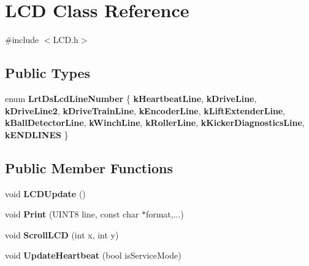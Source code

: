\hypertarget{class_l_c_d}{\section{\-L\-C\-D \-Class \-Reference}
\label{class_l_c_d}
}


{\ttfamily \#include $<$\-L\-C\-D.\-h$>$}

\subsection*{\-Public \-Types}
\begin{DoxyCompactItemize}
\item 
enum {\bfseries \-Lrt\-Ds\-Lcd\-Line\-Number} \{ \*
{\bfseries k\-Heartbeat\-Line}, 
{\bfseries k\-Drive\-Line}, 
{\bfseries k\-Drive\-Line2}, 
{\bfseries k\-Drive\-Train\-Line}, 
\*
{\bfseries k\-Encoder\-Line}, 
{\bfseries k\-Lift\-Extender\-Line}, 
{\bfseries k\-Ball\-Detector\-Line}, 
{\bfseries k\-Winch\-Line}, 
\*
{\bfseries k\-Roller\-Line}, 
{\bfseries k\-Kicker\-Diagnostics\-Line}, 
{\bfseries k\-E\-N\-D\-L\-I\-N\-E\-S}
 \}
\end{DoxyCompactItemize}
\subsection*{\-Public \-Member \-Functions}
\begin{DoxyCompactItemize}
\item 
\hypertarget{class_l_c_d_a6d4ff9436b184ea5b53c531204654ac0}{void {\bfseries \-L\-C\-D\-Update} ()}\label{class_l_c_d_a6d4ff9436b184ea5b53c531204654ac0}

\item 
\hypertarget{class_l_c_d_a399ae4cd5dbcf309ff8715bb31d8084e}{void {\bfseries \-Print} (\-U\-I\-N\-T8 line, const char $\ast$format,...)}\label{class_l_c_d_a399ae4cd5dbcf309ff8715bb31d8084e}

\item 
\hypertarget{class_l_c_d_a4c252131694e58a35d06bd599e725316}{void {\bfseries \-Scroll\-L\-C\-D} (int x, int y)}\label{class_l_c_d_a4c252131694e58a35d06bd599e725316}

\item 
\hypertarget{class_l_c_d_a1c423a85f3ed0ac860e472a5d64ded0c}{void {\bfseries \-Update\-Heartbeat} (bool is\-Service\-Mode)}\label{class_l_c_d_a1c423a85f3ed0ac860e472a5d64ded0c}

\end{DoxyCompactItemize}
